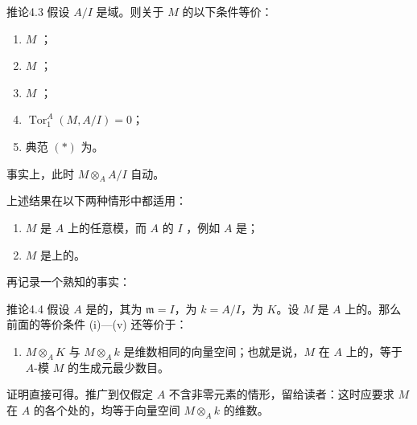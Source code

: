 \begin{SGAresult}{推论}{4.3}
假设 $A/I$ 是域。则关于 $M$ 的以下条件等价：
\begin{enumerate}
\item[(i)] $M$ ；
\item[(ii)] $M$ ；
\item[(iii)] $M$ ；
\item[(iv)] $\operatorname{Tor}_1^A(M,A/I)=0$；
\item[(v)] 典范 $(*)$ 为。
\end{enumerate}
\end{SGAresult}
事实上，此时 $M\otimes_A A/I$ 自动。

上述结果在以下两种情形中都适用：
\begin{enumerate}
\item[(a)] $M$ 是 $A$ 上的任意模，而 $A$ 的 $I$ ，例如 $A$ 是；
\item[(b)] $M$ 是上的。
\end{enumerate}
再记录一个熟知的事实：
\begin{SGAresult}{推论}{4.4}
假设 $A$ 是的，其为 $\mathfrak m=I$，为 $k=A/I$，为 $K$。设 $M$ 是 $A$ 上的。那么前面的等价条件 (i)—(v) 还等价于：
\begin{enumerate}
\item[(vi)] $M\otimes_A K$ 与 $M\otimes_A k$ 是维数相同的向量空间；也就是说，$M$ 在 $A$ 上的，等于 $A$-模 $M$ 的生成元最少数目。
\end{enumerate}
\end{SGAresult}
证明直接可得。推广到仅假定 $A$ 不含非零元素的情形，留给读者：这时应要求 $M$ 在 $A$ 的各个处的，均等于向量空间 $M\otimes_A k$ 的维数。

